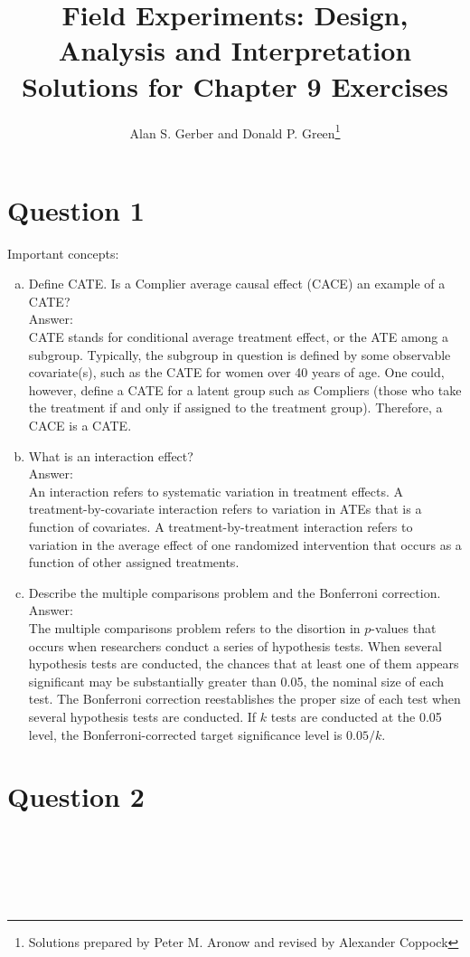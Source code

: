 \documentclass[11pt,notitlepage]{article}\usepackage[]{graphicx}\usepackage[]{color}
\title{Field Experiments: Design, Analysis and Interpretation \\
Solutions for Chapter 9 Exercises}
\author{Alan S. Gerber and Donald P. Green\footnote{Solutions prepared by Peter M. Aronow and revised by Alexander Coppock}}
\date{\vspace{-5ex}}
\makeatletter
\newenvironment{kframe}{%
 \def\at@end@of@kframe{}%
 \ifinner\ifhmode%
  \def\at@end@of@kframe{\end{minipage}}%
  \begin{minipage}{\columnwidth}%
 \fi\fi%
 \def\FrameCommand##1{\hskip\@totalleftmargin \hskip-\fboxsep
 \colorbox{shadecolor}{##1}\hskip-\fboxsep
     \hskip-\linewidth \hskip-\@totalleftmargin \hskip\columnwidth}%
 \MakeFramed {\advance\hsize-\width
   \@totalleftmargin\z@ \linewidth\hsize
   \@setminipage}}%
 {\par\unskip\endMakeFramed%
 \at@end@of@kframe}
\newenvironment{knitrout}{}{} %
\makeatother
\begin{document}
\maketitle


\section*{Question 1}
Important concepts:

\begin{enumerate}[a)]
\item Define CATE. Is a Complier average causal effect (CACE) an example of a CATE?\\
Answer:\\
CATE stands for conditional average treatment effect, or the ATE among a subgroup. Typically, the subgroup in question is defined by some observable covariate(s), such as the CATE for women over 40 years of age. One could, however, define a CATE for a latent group such as Compliers (those who take the treatment if and only if assigned to the treatment group). Therefore, a CACE is a CATE.

\item What is an interaction effect?\\
Answer:\\
An interaction refers to systematic variation in treatment effects. A treatment-by-covariate interaction refers to variation in ATEs that is a function of covariates. A treatment-by-treatment interaction refers to variation in the average effect of one randomized intervention that occurs as a function of other assigned treatments.

\item Describe the multiple comparisons problem and the Bonferroni correction.\\
Answer:\\
The multiple comparisons problem refers to the disortion in $p$-values that occurs when researchers conduct a series of hypothesis tests. When several hypothesis tests are conducted, the chances that at least one of them appears significant may be substantially greater than 0.05, the nominal size of each test. The Bonferroni correction reestablishes the proper size of each test when several hypothesis tests are conducted.   If $k$ tests are conducted at the 0.05 level, the Bonferroni-corrected target significance level is $0.05/k$.
\end{enumerate}

\section*{Question 2}
\begin{knitrout}
\color{fgcolor}\begin{kframe}
\begin{verbatim}






\end{verbatim}
\end{kframe}
\end{knitrout}
\end{document}
